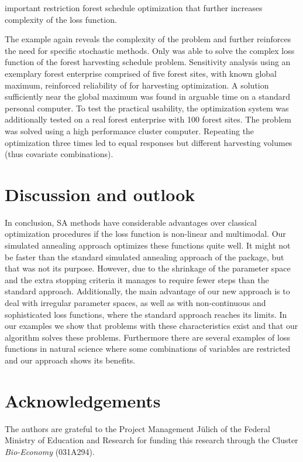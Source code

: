 important restriction forest schedule optimization that further increases complexity of the loss function.

The example again reveals the complexity of the problem and further reinforces the need for specific stochastic methods. Only was able to solve the complex loss function of the forest harvesting schedule problem. Sensitivity analysis using an exemplary forest enterprise comprised of five forest sites, with known global maximum, reinforced reliability of  for harvesting optimization. A solution sufficiently near the global maximum was found in arguable time on a standard personal computer. To test the practical usability, the optimization system was additionally tested on a real forest enterprise with 100 forest sites. The problem was solved using a high performance cluster computer. Repeating the optimization three times led to equal responses but different harvesting volumes (thus covariate combinations).

\section{Discussion and outlook}
In conclusion, SA methods have considerable advantages over classical optimization procedures if the loss function is non-linear and multimodal. Our simulated annealing approach optimizes these functions quite well. It might not be faster than the standard simulated annealing approach of the  package, but that was not its purpose. However, due to the shrinkage of the parameter space and the extra stopping criteria it manages to require fewer steps than the standard approach. Additionally, the main advantage of our new approach is to deal with irregular parameter spaces, as well as with non-continuous and sophisticated loss functions, where the standard approach reaches its limits. In our examples we show that problems with these characteristics exist and that our algorithm solves these problems. Furthermore there are several examples of loss functions in natural science where some combinations of variables are restricted and our approach shows its benefits.

\section{Acknowledgements}
The authors are grateful to the Project Management Jülich of the Federal Ministry of Education and Research for funding this research through the Cluster \textit{Bio-Economy} (031A294).


